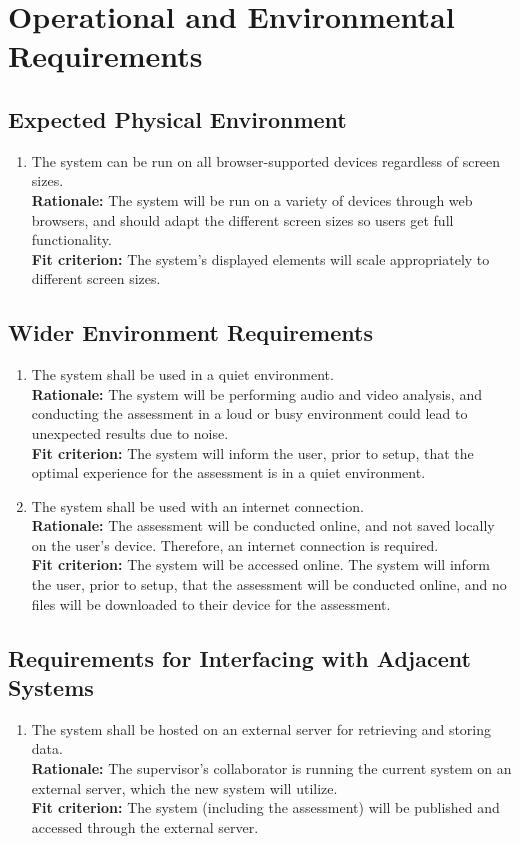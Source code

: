 \documentclass[12pt]{article}
\begin{document}
\section{Operational and Environmental Requirements}
\subsection{Expected Physical Environment}
\begin{enumerate}[{OE-EPE}1. ]
  \item The system can be run on all browser-supported devices regardless of screen sizes.\\
  \textbf{Rationale: }The system will be run on a variety of devices through web browsers, and should adapt the different screen sizes so users get full functionality.\\
  \textbf{Fit criterion: }The system's displayed elements will scale appropriately to different screen sizes.
\end{enumerate}
\subsection{Wider Environment Requirements}
\begin{enumerate}[{OE-WE}1. ]
  \item The system shall be used in a quiet environment.\\
  \textbf{Rationale: }The system will be performing audio and video analysis, and conducting the assessment in a loud or busy environment could lead to unexpected results due to noise.\\
  \textbf{Fit criterion: }The system will inform the user, prior to setup, that the optimal experience for the assessment is in a quiet environment. 
  \item The system shall be used with an internet connection.\\
  \textbf{Rationale: }The assessment will be conducted online, and not saved locally on the user's device. Therefore, an internet connection is required.\\
  \textbf{Fit criterion: }The system will be accessed online. The system will inform the user, prior to setup, that the assessment will be conducted online, and no files will be downloaded to their device for the assessment. 
\end{enumerate}
\subsection{Requirements for Interfacing with Adjacent Systems}
\begin{enumerate}[{OE-IA}1. ]
  \item The system shall be hosted on an external server for retrieving and storing data.\\
  \textbf{Rationale: }The supervisor's collaborator is running the current system on an external server, which the new system will utilize.\\
  \textbf{Fit criterion: }The system (including the assessment) will be published and accessed through the external server.
\end{enumerate}
\end{document}
